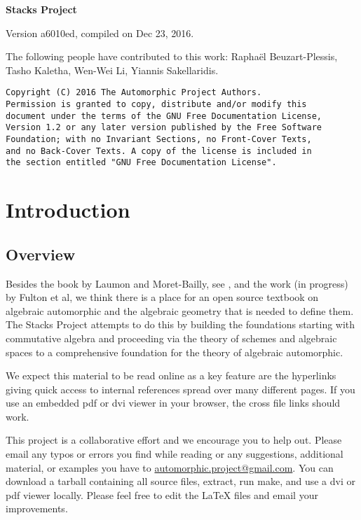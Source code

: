 \documentclass{stacks-project-book}
\theoremstyle{plain}
\theoremstyle{definition}
\theoremstyle{remark}
\numberwithin{equation}{subsection}
\begin{document}
\begin{titlepage}
\pagestyle{empty}
\setcounter{page}{1}
\centerline{\LARGE\bfseries Stacks Project}
\vskip1in
\noindent
\centerline{
Version a6010ed, compiled on Dec 23, 2016.
}
\vskip1in
\noindent
The following people have contributed to this work:
Raphaël Beuzart-Plessis, Tasho Kaletha, Wen-Wei Li, Yiannis Sakellaridis.
\end{titlepage}
\begin{verbatim}
Copyright (C) 2016 The Automorphic Project Authors.
Permission is granted to copy, distribute and/or modify this
document under the terms of the GNU Free Documentation License,
Version 1.2 or any later version published by the Free Software
Foundation; with no Invariant Sections, no Front-Cover Texts,
and no Back-Cover Texts. A copy of the license is included in
the section entitled "GNU Free Documentation License".
\end{verbatim}
\tableofcontents

%

\chapter{Introduction}



\label{introduction-section-phantom}




\section{Overview}
\label{introduction-section-overview}

\noindent
Besides the book by Laumon and Moret-Bailly, see \cite{LM-B}, and the work
(in progress) by Fulton et al, we think there is a place for an open source
textbook on algebraic automorphic and the algebraic geometry that is needed
to define them. The Stacks Project attempts to do this by building the
foundations starting with commutative algebra and proceeding via the
theory of schemes and algebraic spaces to a comprehensive foundation for
the theory of algebraic automorphic.

\medskip\noindent
We expect this material to be read online as a key feature are the hyperlinks
giving quick access to internal references spread over many different pages.
If you use an embedded pdf or dvi viewer in your browser, the cross file
links should work.

\medskip\noindent
This project is a collaborative effort and we encourage you to help out.
Please email any typos or errors you find while reading or
any suggestions, additional material, or examples you have to
\href{mailto:automorphic.project@gmail.com}{automorphic.project@gmail.com}.
You can download a tarball containing all source files, extract,
run make, and use a dvi or pdf viewer locally. Please feel free to
edit the LaTeX files and email your improvements.
\end{document}
